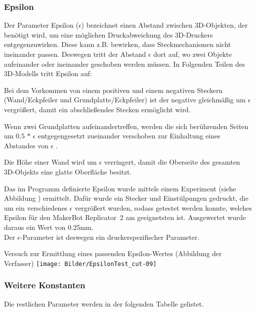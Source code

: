 \subsubsection{Epsilon}
Der Parameter Epsilon ({\Large$\epsilon$}) bezeichnet einen Abstand zwischen 3D-Objekten, der benötigt wird, um eine möglichen Druckabweichung des 3D-Druckers entgegenzuwirken.
Diese kann z.B. bewirken, dass Steckmechanismen nicht ineinander passen.
Deswegen tritt der Abstand {\Large$\epsilon$} dort auf, wo zwei Objekte aufeinander oder ineinander geschoben werden müssen.
In Folgenden Teilen des 3D-Modells tritt Epsilon auf:

\begin{compactenum}
	\item Bei dem Vorkommen von einem positiven und einem negativen Steckern (Wand/Eckpfeiler und Grundplatte/Eckpfeiler) ist der negative gleichmäßig um {\Large$\epsilon$} vergrößert, damit ein abschließendes Stecken ermöglicht wird.
	\item Wenn zwei Grundplatten aufeinandertreffen, werden die sich berührenden Seiten um $0.5$ $*$ {\Large$\epsilon$} entgegengesetzt zueinander verschoben zur Einhaltung eines Abstandes von {\Large$\epsilon$} .
	\item Die Höhe einer Wand wird um {\Large$\epsilon$} verringert, damit die Oberseite des gesamten 3D-Objekts eine glatte Oberfläche besitzt.
\end{compactenum}

Das im Programm definierte Epsilon wurde mittels einem Experiment (siehe Abbildung \thebildnrnext) ermittelt.
Dafür wurde ein Stecker und Einstülpungen gedruckt, die um ein verschiedenes {\Large$\epsilon$} vergrößert wurden, sodass getestet werden konnte, welches Epsilon für den MakerBot Replicator\texttrademark\ 2 am geeignetsten ist.
Ausgewertet wurde daraus ein Wert von 0.25mm. \\
Der {\Large$\epsilon$}-Parameter ist deswegen ein druckerspezifischer Parameter.

\begin{Bild}{Versuch zur Ermittlung eines passenden Epsilon-Wertes (Abbildung der Verfasser)}
		\texttt{[image: Bilder/EpsilonTest\_cut-09]}
\end{Bild}

\subsubsection{Weitere Konstanten}
Die restlichen Parameter werden in der folgenden Tabelle gelistet. \\

